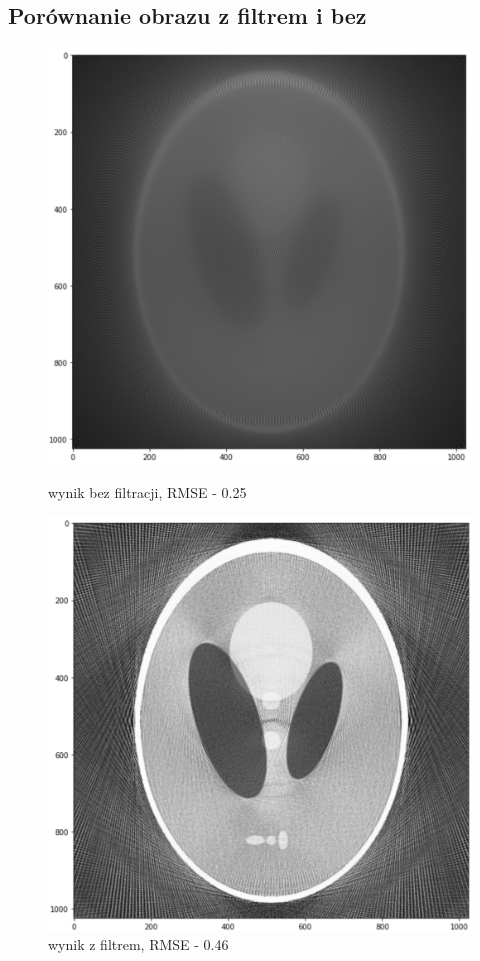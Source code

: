 \documentclass[polish,polish,a4paper]{article}
\begin{document}
		\subsection{Porównanie obrazu z filtrem i bez}
			\begin{figure}[!h]
				\centering
				\begin{minipage}{0.45\linewidth}
					\includegraphics[width=\linewidth]{img/shepp_nf.png}
					\caption{wynik bez filtracji, RMSE - 0.25}
				\end{minipage}
				\hfill
				\begin{minipage}{0.45\linewidth}
					\includegraphics[width=\linewidth]{img/shepp_f.png}
					\caption{wynik z filtrem, RMSE - 0.46}
				\end{minipage}
			\end{figure}
			
\end{document}
